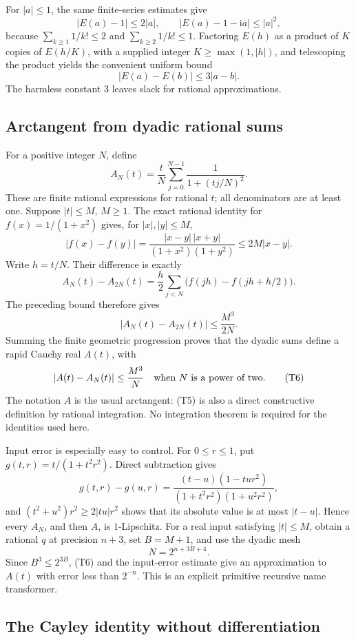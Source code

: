 For $|a|\leq1$, the same finite-series estimates give
\[
 |E(a)-1|\leq 2|a|,\qquad
 |E(a)-1-\mathrm ia|\leq |a|^2,                             \tag{T3}
\]
because $\sum_{k\geq1}1/k!\leq2$ and
$\sum_{k\geq2}1/k!\leq1$.  Factoring $E(h)$ as a product of $K$ copies
of $E(h/K)$, with a supplied integer $K\geq\max(1,|h|)$, and telescoping
the product yields the convenient uniform bound
\[
 |E(a)-E(b)|\leq 3|a-b|.                                   \tag{T4}
\]
The harmless constant $3$ leaves slack for rational approximations.

\subsection{Arctangent from dyadic rational sums}

For a positive integer $N$, define
\[
 A_N(t)=\frac{t}{N}\sum_{j=0}^{N-1}
                  \frac{1}{1+(tj/N)^2}.                    \tag{T5}
\]
These are finite rational expressions for rational $t$; all denominators
are at least one.  Suppose $|t|\leq M$, $M\geq1$.  The exact rational
identity for $f(x)=1/(1+x^2)$ gives, for $|x|,|y|\leq M$,
\[
 |f(x)-f(y)|
 =\frac{|x-y|\,|x+y|}{(1+x^2)(1+y^2)}
 \leq2M|x-y|.
\]
Write $h=t/N$.  Their difference is exactly
\[
 A_N(t)-A_{2N}(t)
 =\frac h2\sum_{j<N}\bigl(f(jh)-f(jh+h/2)\bigr).
\]
The preceding bound therefore gives
\[
 |A_N(t)-A_{2N}(t)|\leq\frac{M^3}{2N}.
\]
Summing the finite geometric progression proves that the dyadic sums
define a rapid Cauchy real $A(t)$, with
\[
 |A(t)-A_N(t)|\leq\frac{M^3}{N}
 \quad\hbox{when $N$ is a power of two}.                    \tag{T6}
\]
The notation $A$ is the usual arctangent: (T5) is also a direct
constructive definition by rational integration.  No integration theorem
is required for the identities used here.

Input error is especially easy to control.  For $0\leq r\leq1$, put
$g(t,r)=t/(1+t^2r^2)$.  Direct subtraction gives
\[
 g(t,r)-g(u,r)
 =\frac{(t-u)(1-tu r^2)}{(1+t^2r^2)(1+u^2r^2)},
\]
and $(t^2+u^2)r^2\geq2|tu|r^2$ shows that its absolute value is at most
$|t-u|$.  Hence every $A_N$, and then $A$, is $1$-Lipschitz.
For a real input satisfying $|t|\leq M$, obtain a rational $q$ at
precision $n+3$, set $B=M+1$, and use the dyadic mesh
\[
 N=2^{n+3B+4}.
\]
Since $B^3\leq2^{3B}$, (T6) and the input-error estimate give an
approximation to $A(t)$ with error less than $2^{-n}$.  This is an
explicit primitive recursive name transformer.

\subsection{The Cayley identity without differentiation}

